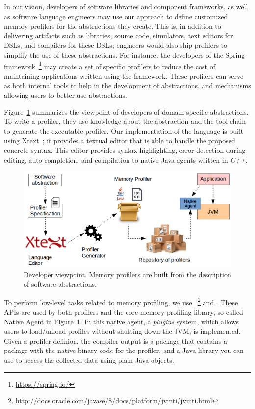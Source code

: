 
In our vision, developers of software libraries and component frameworks, as well as software language engineers may use our approach to  define customized memory profilers for the abstractions they create.
This is, in addition to delivering artifacts such as libraries, source code, simulators, text editors for DSLs, and compilers for these DSLs; engineers would also ship profilers to simplify the use of these abstractions.
For instance, the developers of the Spring framework~\footnote{\url{https://spring.io/}} may create a set of specific profilers to reduce the cost of maintaining applications written using the framework.
These profilers can serve as both internal tools to help in the development of abstractions, and mechanisms allowing users to better use abstractions.

Figure~\ref{fig:dsl-tooling-developer} summarizes the viewpoint of developers of domain-specific abstractions.
To write a profiler, they use knowledge about the abstraction and the tool chain to generate the executable profiler. 
Our implementation of the language is built using Xtext~\cite{Eysholdt:2010:XIY:1869542.1869625}; it provides a textual editor that is able to handle the proposed concrete syntax.
This editor provides syntax highlighting, error detection during editing, auto-completion, and compilation to native Java agents written in \textit{C++}.

\begin{figure}
\centering
\includegraphics[scale=0.45]{./chapter6/fig/developer-profiler-view.png}
\caption{Developer viewpoint. Memory profilers are built from the description of software abstractions.}\label{fig:dsl-tooling-developer}
\end{figure}

To perform low-level tasks related to memory profiling, we use ~\footnote{\url{http://docs.oracle.com/javase/8/docs/platform/jvmti/jvmti.html}} and .
These APIs are used by both profilers and the core memory profiling library, so-called Native Agent in Figure~\ref{fig:dsl-tooling-developer}.
In this native agent, a \textit{plugins} system, which allows users to load/unload profiles without shutting down the JVM, is implemented.
Given a profiler definion, the compiler output is a package that contains a package with the native binary code for the profiler, and a Java library you can use to access the collected data using plain Java objects.

